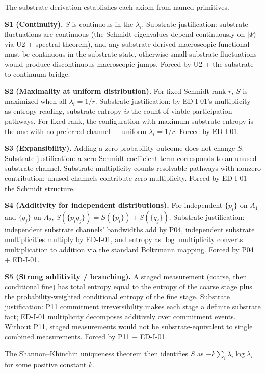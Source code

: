 \documentclass[11pt,a4paper]{article}
\begin{document}
The substrate-derivation establishes each axiom from named primitives.

\textbf{S1 (Continuity).} $S$ is continuous in the $\lambda_i$. Substrate justification: substrate fluctuations are continuous (the Schmidt eigenvalues depend continuously on $|\Psi\rangle$ via U2 + spectral theorem), and any substrate-derived macroscopic functional must be continuous in the substrate state, otherwise small substrate fluctuations would produce discontinuous macroscopic jumps. Forced by U2 + the substrate-to-continuum bridge.

\textbf{S2 (Maximality at uniform distribution).} For fixed Schmidt rank $r$, $S$ is maximized when all $\lambda_i = 1/r$. Substrate justification: by ED-I-01's multiplicity-as-entropy reading, substrate entropy \emph{is} the count of viable participation pathways. For fixed rank, the configuration with maximum substrate entropy is the one with no preferred channel --- uniform $\lambda_i = 1/r$. Forced by ED-I-01.

\textbf{S3 (Expansibility).} Adding a zero-probability outcome does not change $S$. Substrate justification: a zero-Schmidt-coefficient term corresponds to an unused substrate channel. Substrate multiplicity counts resolvable pathways with nonzero contribution; unused channels contribute zero multiplicity. Forced by ED-I-01 + the Schmidt structure.

\textbf{S4 (Additivity for independent distributions).} For independent $\{p_i\}$ on $A_1$ and $\{q_j\}$ on $A_2$, $S(\{p_i q_j\}) = S(\{p_i\}) + S(\{q_j\})$. Substrate justification: independent substrate channels' bandwidths add by P04, independent substrate multiplicities multiply by ED-I-01, and entropy as $\log$ multiplicity converts multiplication to addition via the standard Boltzmann mapping. Forced by P04 + ED-I-01.

\textbf{S5 (Strong additivity / branching).} A staged measurement (coarse, then conditional fine) has total entropy equal to the entropy of the coarse stage plus the probability-weighted conditional entropy of the fine stage. Substrate justification: P11 commitment irreversibility makes each stage a definite substrate fact; ED-I-01 multiplicity decomposes additively over commitment events. Without P11, staged measurements would not be substrate-equivalent to single combined measurements. Forced by P11 + ED-I-01.

The Shannon--Khinchin uniqueness theorem then identifies $S$ as $-k \sum_i \lambda_i \log \lambda_i$ for some positive constant $k$.
\end{document}

